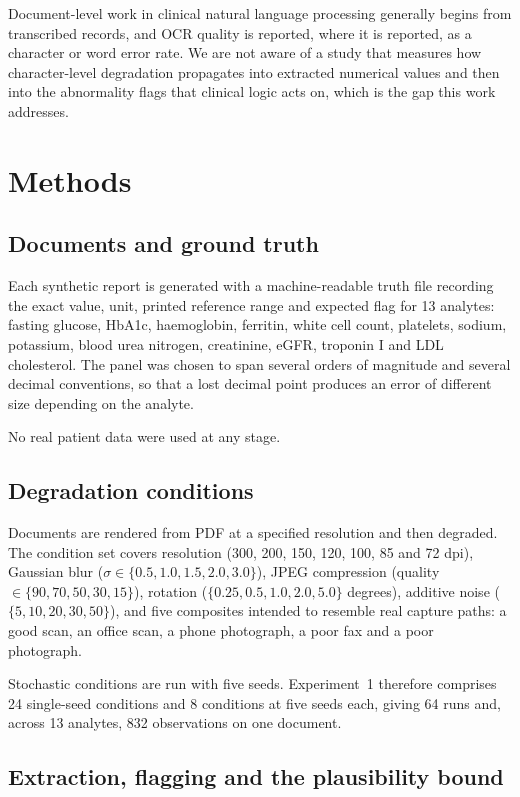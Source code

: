 \documentclass[11pt]{article}
\begin{document}
Document-level work in clinical natural language processing generally begins from transcribed
records, and OCR quality is reported, where it is reported, as a character or word error rate.
We are not aware of a study that measures how character-level degradation propagates into
extracted numerical values and then into the abnormality flags that clinical logic acts on,
which is the gap this work addresses.

\section{Methods}

\subsection{Documents and ground truth}

Each synthetic report is generated with a machine-readable truth file recording the exact value,
unit, printed reference range and expected flag for 13 analytes: fasting glucose, HbA1c,
haemoglobin, ferritin, white cell count, platelets, sodium, potassium, blood urea nitrogen,
creatinine, eGFR, troponin I and LDL cholesterol. The panel was chosen to span several orders of
magnitude and several decimal conventions, so that a lost decimal point produces an error of
different size depending on the analyte.

No real patient data were used at any stage.

\subsection{Degradation conditions}

Documents are rendered from PDF at a specified resolution and then degraded. The condition set
covers resolution (300, 200, 150, 120, 100, 85 and 72 dpi), Gaussian blur
($\sigma \in \{0.5, 1.0, 1.5, 2.0, 3.0\}$), JPEG compression (quality
$\in \{90, 70, 50, 30, 15\}$), rotation ($\{0.25, 0.5, 1.0, 2.0, 5.0\}$ degrees), additive
noise ($\{5, 10, 20, 30, 50\}$), and five composites intended to resemble real capture paths:
a good scan, an office scan, a phone photograph, a poor fax and a poor photograph.

Stochastic conditions are run with five seeds. Experiment~1 therefore comprises 24
single-seed conditions and 8 conditions at five seeds each, giving 64 runs and, across 13
analytes, 832 observations on one document.

\subsection{Extraction, flagging and the plausibility bound}
\end{document}
